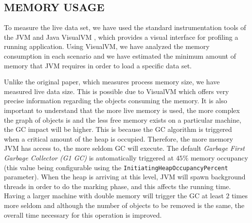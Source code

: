 \documentclass[a4paper,twoside]{article}
\begin{document}
\subsection{\uppercase{Memory Usage}}
To measure the live data set, we have used the standard instrumentation tools of the JVM and
Java VisualVM \cite{visualvm:oracle}, which provides a visual interface for profiling a running application. Using VisualVM, we have analyzed the memory consumption in each scenario and we have estimated the minimum amount of memory that JVM requires in order to load a specific data set.

Unlike the original paper, which measures process memory size, we have measured live data size.  This is possible due to VisualVM which offers very precise information regarding the objects consuming the memory.
It is also important to understand that the more live memory is used, the more complex the graph of objects is and the less free memory exists on a particular machine, the GC impact will be higher.
This is because the GC algorithm is triggered when a critical amount of the heap is occupied.
Therefore, the more memory JVM has access to, the more seldom GC will execute.
The default {\it Garbage First Garbage Collector (G1 GC)} is automatically triggered at $45\%$ memory occupancy (this value being configurable using the \texttt{InitiatingHeapOccupancyPercent} parameter). When the heap is arriving at this level, JVM will spawn background threads in order to do the marking phase, and this affects the running time.
Having a larger machine with double memory will trigger the GC at least $2$ times more seldom and
although the number of objects to be removed is the same, the overall time necessary for this operation is improved.
\end{document}
